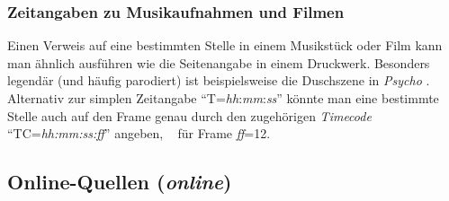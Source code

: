 %
%
%
%


\subsubsection{Zeitangaben zu Musikaufnahmen und Filmen} 

Einen Verweis auf eine bestimmten Stelle in einem Musikstück oder Film kann man 
ähnlich ausführen wie die Seitenangabe in einem Druckwerk.
Besonders legendär (und häufig parodiert) ist beispielsweise die Duschszene
in \emph{Psycho} \cite[T=00:32:10]{Psycho1960}.
Alternativ zur simplen Zeitangabe "`T=\emph{hh}:\emph{mm}:\emph{ss}"' 
könnte man eine bestimmte Stelle auch auf den Frame genau durch 
den zugehörigen \emph{Timecode} "`TC=\emph{hh:mm:ss:ff}"' angeben, 
\zB\ \cite[TC=00:32:10:12]{Psycho1960} für Frame \emph{ff}=12.



\subsection{Online-Quellen (\emph{online})}
\label{sec:KategorieOnline}

